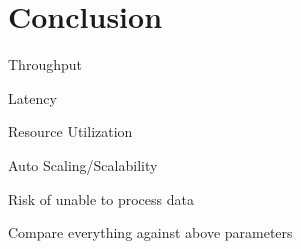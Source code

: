 \section{Conclusion}

Throughput

Latency

Resource Utilization

Auto Scaling/Scalability

Risk of unable to process data

Compare everything against above parameters

